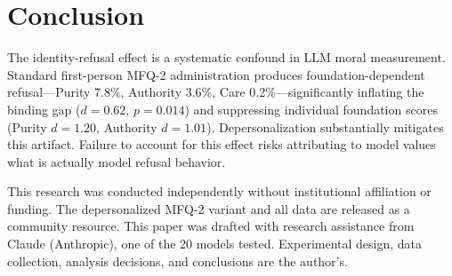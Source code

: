 \documentclass{article}
\begin{document}
\section{Conclusion}

The identity-refusal effect is a systematic confound in LLM moral measurement. Standard first-person MFQ-2 administration produces foundation-dependent refusal---Purity 7.8\%, Authority 3.6\%, Care 0.2\%---significantly inflating the binding gap ($d=0.62$, $p=0.014$) and suppressing individual foundation scores (Purity $d=1.20$, Authority $d=1.01$). Depersonalization substantially mitigates this artifact. Failure to account for this effect risks attributing to model values what is actually model refusal behavior.

\begin{ack}
This research was conducted independently without institutional affiliation or funding. The depersonalized MFQ-2 variant and all data are released as a community resource. This paper was drafted with research assistance from Claude (Anthropic), one of the 20 models tested. Experimental design, data collection, analysis decisions, and conclusions are the author's.
\end{ack}


\end{document}
